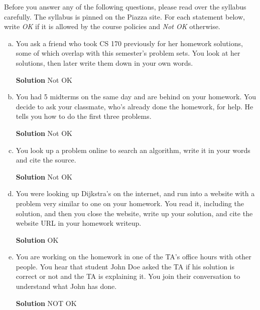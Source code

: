 \begin{qunlist}

Before you answer any of the following questions, please read over the syllabus carefully. The syllabus is pinned on the Piazza site. For each statement below, write \textit{OK} if it is allowed by the course policies and \textit{Not OK} otherwise.

\begin{enumerate}[(a)]
\item You ask a friend who took CS 170 previously for her homework solutions, some of which overlap with this semester's problem sets. You look at her solutions, then later write them down in your own words.
\begin{mdframed}
	\textbf{Solution} Not OK
\end{mdframed}

\item You had 5 midterms on the same day and are behind on your homework. You decide to ask your classmate, who's already done the homework, for help. He tells you how to do the first three problems.
\begin{mdframed}
	\textbf{Solution} Not OK
\end{mdframed}

\item You look up a problem online to search an algorithm, write it in your words and cite the source.
\begin{mdframed}
	\textbf{Solution} Not OK
\end{mdframed}

\item You were looking up Dijkstra's on the internet, and run into a website with a problem very similar to one on your homework. You read it, including the solution, and then you close the website, write up your solution, and cite the website URL in your homework writeup.
\begin{mdframed}
	\textbf{Solution} OK
\end{mdframed}

\item You are working on the homework in one of the TA's office hours with other people. You hear that student John Doe asked the TA if his solution is correct or not and the TA is explaining it. You join their conversation to understand what John has done.
\begin{mdframed}
	\textbf{Solution} NOT OK
\end{mdframed}


\end{enumerate}
\end{qunlist}
